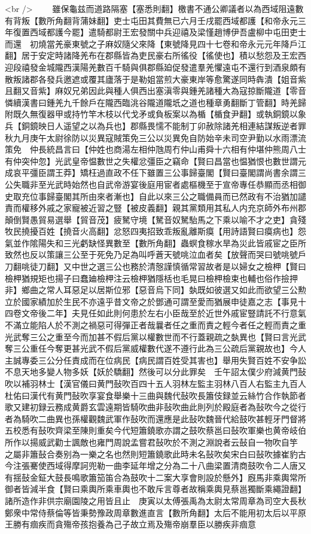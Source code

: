 <br />
　　雖保龜兹而道路隔塞【塞悉則翻】檄書不通公卿議者以為西域阻遠數有背叛【數所角翻背蒲妹翻】吏士屯田其費無已六月壬戌罷西域都護【和帝永元三年復置西域都護今罷】遣騎都尉王宏發關中兵迎禧及梁慬趙博伊吾盧柳中屯田吏士而還　初燒當羌豪東號之子麻奴隨父來降【東號降見四十七卷和帝永元元年降戶江翻】居于安定時諸降羌布在郡縣皆為吏民豪右所徭役【徭使也】積以愁怨及王宏西迎段禧發金城隴西漢陽羌數百千騎與俱郡縣廹促發遣羣羌懼遠屯不還行到酒泉頗有散叛諸郡各發兵邀遮或覆其廬落于是勒姐當煎大豪東岸等愈驚遂同時犇潰【姐音紫且翻又音紫】麻奴兄弟因此與種人俱西出塞滇零與鍾羌諸種大為寇掠斷隴道【零音憐續漢書曰鍾羌九千餘戶在隴西臨洮谷隴道隴坁之道也種章勇翻斷丁管翻】時羌歸附既久無復器甲或持竹竿木枝以代戈矛或負板案以為楯【楯食尹翻】或執銅鏡以象兵【銅鏡映日人遥望之以為兵也】郡縣畏懦不能制丁卯赦除諸羌相連結謀叛逆者罪　秋九月庚午太尉徐防以災異寇賊策免三公以災異免自防始辛未司空尹勤以水雨漂流策免　仲長統昌言曰【仲姓也商湯左相仲虺周冇仲山甫舜十六相有仲堪仲熊周八士有仲突仲忽】光武皇帝愠數世之失權忿彊臣之竊命【賢曰昌當也愠猶恨也數世謂元成哀平彊臣謂王莽】矯枉過直政不任下雖置三公事歸臺閣【賢曰臺閣謂尚書余謂三公失職非至光武時始然也自武帝游宴後庭用宦者處樞機至于宣帝專任恭顯而丞相御史取充位事歸臺閣其所由來者漸也】自此以來三公之職備員而已然政有不治猶加譴責而權移外戚之家寵被近習之豎【被皮義翻】親其黨類用其私人内充京師外布州郡顛倒賢愚貿易選舉【貿音茂】疲駑守境【駑音奴駑駘馬之下乘以喻不才之吏】貪殘牧民撓擾百姓【撓音火高翻】忿怒四夷招致乖叛亂離斯瘼【用詩語賢曰瘼病也】怨氣並作隂陽失和三光虧缺怪異數至【數所角翻】蟲螟食稼水旱為災此皆戚宦之臣所致然也反以策讓三公至于死免乃足為叫呼蒼天號咷泣血者矣【放聲而哭曰號咷號戶刀翻咷徒刀翻】又中世之選三公也務於清慤謹慎循常習故者是以婦女之檢柙【賢曰檢柙猶規矩也揚子曰蠢廸檢柙注云檢柙猶隱栝也毛晃曰檢柙檢束也輔也俗作撿押非】鄉曲之常人耳惡足以居斯位邪【惡音烏下同】埶既如彼選又如此而欲望三公勲立於國家績加於生民不亦遠乎昔文帝之於鄧通可謂至愛而猶展申徒嘉之志【事見十四卷文帝後二年】夫見任如此則何患於左右小臣哉至於近世外戚宦豎請託不行意氣不滿立能陷人於不測之禍惡可得彈正者哉曩者任之重而責之輕今者任之輕而責之重光武奪三公之重至今而加甚不假后黨以權數世而不行蓋親疏之埶異也【賢曰言光武奪三公重任今奪更甚光武不假后黨威權數代遂不遵行此為三公疏后黨親故也】今人主誠專委三公分任責成而在位病民【病民謂百姓受其害也】舉用失賢百姓不安争訟不息天地多變人物多妖【妖於驕翻】然後可以分此罪矣　壬午詔太僕少府減黄門鼔吹以補羽林士【漢官儀曰黄門鼔吹百四十五人羽林左監主羽林八百人右監主九百人杜佑曰漢代有黄門鼔吹享宴食舉樂十三曲與魏代鼔吹長簫伎録並云絲竹合作執節者歌又建初録云務成黄爵玄雲遠期皆騎吹曲非鼔吹曲此則列於殿庭者為鼔吹今之從行者為騎吹二曲異也孫權觀魏武軍作鼔吹而還應是此鼔吹魏晉代給鼓吹甚輕牙門督將五校悉有鼔吹齊梁至陳則重矣今代短簫鐃歌亦謂之鼓吹蔡邕曰鼔吹軍樂也黄帝岐伯所作以揚威武勸士諷敵也雍門周說孟嘗君鼔吹於不測之淵說者云鼔自一物吹自竽之屬非簫鼔合奏别為一樂之名也然則短簫鐃歌此時未名鼔吹矣宋白曰鼔吹據崔豹古今注張騫使西域得摩訶兜勒一曲李延年增之分為二十八曲梁置清商鼓吹令二人唐又有揺鼔金鉦大鼓長鳴歌簫笳笛合為鼓吹十二案大享會則設於懸外】廐馬非乘輿常所御者皆減半食【賢曰乘輿所乘車輿也不敢斥言尊者故稱乘輿見蔡邕獨斷乘繩證翻】諸所造作非供宗廟園陵之用皆且止　庚寅以太傅張禹為太尉太常周章為司空大長秋鄭衆中常侍蔡倫等皆秉勢豫政周章數進直言【數所角翻】太后不能用初太后以平原王勝有痼疾而貪殤帝孩抱養為己子故立焉及殤帝崩羣臣以勝疾非痼意
